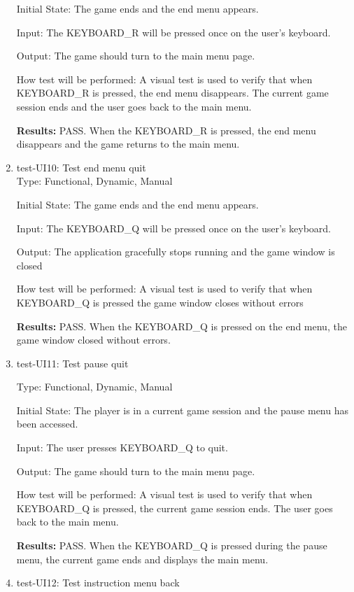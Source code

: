 \documentclass[12pt, titlepage]{article}
\begin{document}
\begin{enumerate}
Initial State: The game ends and the end menu appears.
					
Input: The KEYBOARD\_R will be pressed once on the user's keyboard.
					
Output: The game should turn to the main menu page.
					
How test will be performed: A visual test is used to verify that when KEYBOARD\_R is pressed, the end menu disappears. The current game session ends and the user goes back to the main menu.	

\textbf{Results: }PASS. When the KEYBOARD\_R is pressed, the end menu disappears and the game returns to the main menu.

\item{test-UI10: Test end menu quit\\}
Type: Functional, Dynamic, Manual
					
Initial State: The game ends and the end menu appears.
					
Input: The KEYBOARD\_Q will be pressed once on the user's keyboard.
					
Output: The application gracefully stops running and the game window is closed
					
How test will be performed: A visual test is used to verify that when KEYBOARD\_Q is pressed the game window closes without errors

\textbf{Results: }PASS. When the KEYBOARD\_Q is pressed on the end menu, the game window closed without errors.

\item{test-UI11: Test pause quit\\}

Type: Functional, Dynamic, Manual
					
Initial State: The player is in a current game session and the pause menu has been accessed.
					
Input: The user presses KEYBOARD\_Q to quit.
					
Output: The game should turn to the main menu page.
					
How test will be performed: A visual test is used to verify that when KEYBOARD\_Q is pressed, the current game session ends. The user goes back to the main menu.	

\textbf{Results:} PASS. When the KEYBOARD\_Q is pressed during the pause menu, the current game ends and displays the main menu.

\item{test-UI12: Test instruction menu back\\}


\end{enumerate}
\end{document}
